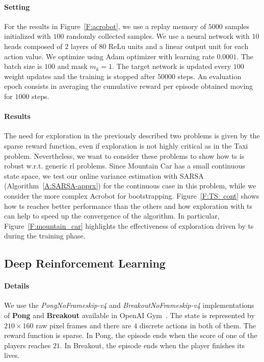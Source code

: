 \paragraph{Setting} For the results in Figure~\ref{F:acrobot}, we use a replay memory of $5000$ samples initialized with $100$ randomly collected samples. We use a neural network with $10$ heads composed of $2$ layers of $80$ ReLu units and a linear output unit for each action value. We optimize using Adam optimizer with learning rate $0.0001$. The batch size is $100$ and mask $m_k = 1$. The target network is updated every $100$ weight updates and the training is stopped after $50000$ steps. An evaluation epoch consists in averaging the cumulative reward per episode obtained moving for $1000$ steps.

\paragraph{Results} The need for exploration in the previously described two problems is given by the sparse reward function, even if exploration is not highly critical as in the Taxi problem. Nevertheless, we want to consider these problems to show how \gls{ts} is robust w.r.t. generic \gls{rl} problems. Since Mountain Car has a small continuous state space, we test our online variance estimation with SARSA (Algorithm~\ref{A:SARSA-apprx}) for the continuous case in this problem, while we consider the more complex Acrobot for bootstrapping. Figure~\ref{F:TS_cont} shows how \gls{ts} reaches better performance than the others and how exploration with \gls{ts} can help to speed up the convergence of the algorithm. In particular, Figure~\ref{F:mountain_car} highlights the effectiveness of exploration driven by \gls{ts} during the training phase.

\subsection{Deep Reinforcement Learning}
\paragraph{Details} We use the \textit{PongNoFrameskip-v4} and \textit{BreakoutNoFrameskip-v4} implementations of \textbf{Pong} and \textbf{Breakout} available in OpenAI Gym~\cite{gym}. The state is represented by $210 \times 160$ raw pixel frames and there are $4$ discrete actions in both of them. The reward function is sparse. In Pong, the episode ends when the score of one of the players reaches $21$. In Breakout, the episode ends when the player finishes its lives.
